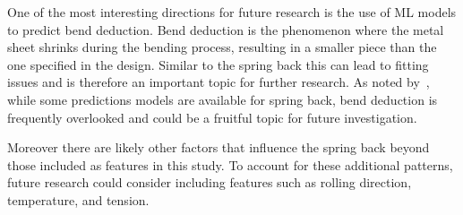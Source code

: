 One of the most interesting directions for future research is the use of \ac{ML} models to predict bend deduction.
Bend deduction is the phenomenon where the metal sheet shrinks during the bending process, resulting in a smaller
piece than the one specified in the design.
Similar to the spring back this can lead to fitting issues and is therefore an important topic for further research.
As noted by~\cite{strano2017fusion}, while some predictions models are available for spring back, bend deduction is
frequently overlooked and could be a fruitful topic for future investigation.

Moreover there are likely other factors that influence the spring back beyond those included as features in this study.
To account for these additional patterns, future research could consider including features such as rolling
direction, temperature, and tension.

